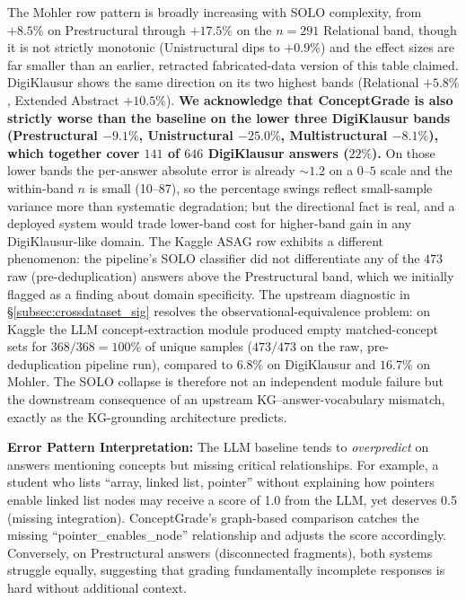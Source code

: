 \documentclass[conference]{IEEEtran}
\begin{document}
The Mohler row pattern is broadly increasing with SOLO complexity, from
$+8.5\%$ on Prestructural through $+17.5\%$ on the $n=291$ Relational band,
though it is not strictly monotonic (Unistructural dips to $+0.9\%$) and
the effect sizes are far smaller than an earlier, retracted fabricated-data
version of this table claimed. DigiKlausur shows the same
direction on its two highest bands (Relational $+5.8\%$, Extended Abstract
$+10.5\%$). \textbf{We acknowledge that ConceptGrade is also strictly worse
than the baseline on the lower three DigiKlausur bands (Prestructural
$-9.1\%$, Unistructural $-25.0\%$, Multistructural $-8.1\%$), which
together cover $141$ of $646$ DigiKlausur answers ($22\%$).} On those
lower bands the per-answer absolute error is already $\sim 1.2$ on a
$0$--$5$ scale and the within-band $n$ is small (10--87), so the
percentage swings reflect small-sample variance more than systematic
degradation; but the directional fact is real, and a deployed system would
trade lower-band cost for higher-band gain in any DigiKlausur-like
domain. The Kaggle ASAG row exhibits a different phenomenon: the
pipeline's SOLO classifier did not differentiate any of the $473$ raw
(pre-deduplication) answers above the Prestructural band, which we
initially flagged as a finding about domain specificity. The upstream
diagnostic in
\S\ref{subsec:crossdataset_sig} resolves the observational-equivalence
problem: on Kaggle the LLM concept-extraction module produced empty
matched-concept sets for $368/368 = 100\%$ of unique samples
($473/473$ on the raw, pre-deduplication pipeline run), compared to
$6.8\%$ on DigiKlausur and $16.7\%$ on Mohler. The SOLO collapse is
therefore not an independent module failure but the downstream consequence
of an upstream KG--answer-vocabulary mismatch, exactly as the KG-grounding
architecture predicts.

\textbf{Error Pattern Interpretation:} The LLM baseline tends to \emph{overpredict}
on answers mentioning concepts but missing critical relationships. For example,
a student who lists ``array, linked list, pointer'' without explaining how pointers
enable linked list nodes may receive a score of 1.0 from the LLM, yet deserves
0.5 (missing integration). ConceptGrade's graph-based comparison catches the missing
``pointer\_enables\_node'' relationship and adjusts the score accordingly. Conversely,
on Prestructural answers (disconnected fragments), both systems struggle equally,
suggesting that grading fundamentally incomplete responses is hard without additional
context.
\end{document}
